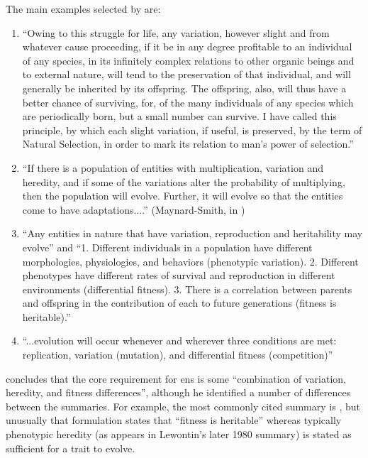The main examples selected by \textcite{Godfrey-Smith2007} are:

\begin{enumerate}
\item ``Owing to this struggle for life, any variation, however slight and from whatever cause proceeding, if it be in any degree profitable to an individual of any species, in its infinitely complex relations to other organic beings and to external nature, will tend to the preservation of that individual, and will generally be inherited by its offspring. The offspring, also, will thus have a better chance of surviving, for, of the many individuals of any species which are periodically born, but a small number can survive. I have called this principle, by which each slight variation, if useful, is preserved, by the term of Natural Selection, in order to mark its relation to man's power of selection.'' \parencite{Darwin1859}
\item ``If there is a population of entities with multiplication, variation and heredity, and if some of the variations alter the probability of multiplying, then the population will evolve. Further, it will evolve so that the entities come to have adaptations....'' (Maynard-Smith, in \textcite{Griesemer2001})
\item ``Any entities in nature that have variation, reproduction and heritability may evolve'' \parencite{Lewontin:1970mc} and ``1. Different individuals in a population have different morphologies, physiologies, and behaviors (phenotypic variation). 2. Different phenotypes have different rates of survival and reproduction in different environments (differential fitness). 3. There is a correlation between parents and offspring in the contribution of each to future generations (fitness is heritable).'' \textcite{Lewontin:1970mc}
\item ``...evolution will occur whenever and wherever three conditions are met: replication, variation (mutation), and differential fitness (competition)'' \parencite[quoting Daniel Dennett]{Ofria2004}
\end{enumerate}

\Textcite{Godfrey-Smith2007} concludes that the core requirement for \gls{ens} is some ``combination of variation, heredity, and fitness differences'', although he identified a number of differences between the summaries. For example, the most commonly cited summary is \textcite{Lewontin:1970mc}, but unusually that formulation states that ``fitness is heritable'' whereas typically phenotypic heredity (as appears in Lewontin's later 1980 summary) is stated as sufficient for a trait to evolve. 

